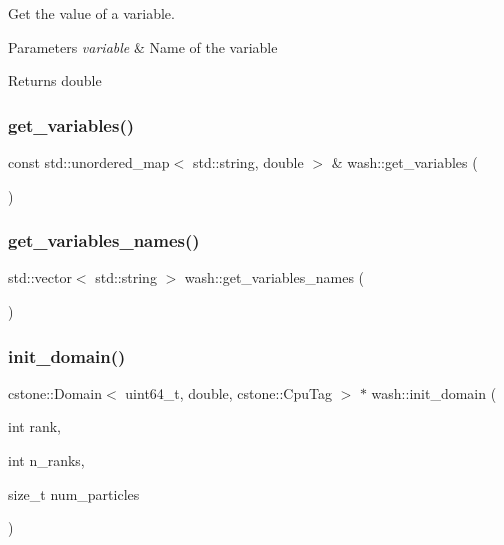 Get the value of a variable. 


\begin{DoxyParams}{Parameters}
{\em variable} & Name of the variable \\
\hline
\end{DoxyParams}
\begin{DoxyReturn}{Returns}
double 
\end{DoxyReturn}
\mbox{\label{namespacewash_a1c3211b3b0c5f804ecd247b159703b68}} 
\subsubsection{\texorpdfstring{get\+\_\+variables()}{get\_variables()}}
{\footnotesize\ttfamily const std\+::unordered\+\_\+map$<$ std\+::string, double $>$ \& wash\+::get\+\_\+variables (\begin{DoxyParamCaption}{ }\end{DoxyParamCaption})}

\mbox{\label{namespacewash_aebd88baa23220ce7842c503157c0bb71}} 
\subsubsection{\texorpdfstring{get\+\_\+variables\+\_\+names()}{get\_variables\_names()}}
{\footnotesize\ttfamily std\+::vector$<$ std\+::string $>$ wash\+::get\+\_\+variables\+\_\+names (\begin{DoxyParamCaption}{ }\end{DoxyParamCaption})}

\mbox{\label{namespacewash_a1473dce3a353e16eae7e13990f27a9b3}} 
\subsubsection{\texorpdfstring{init\+\_\+domain()}{init\_domain()}}
{\footnotesize\ttfamily cstone\+::\+Domain$<$ uint64\+\_\+t, double, cstone\+::\+Cpu\+Tag $>$ $\ast$ wash\+::init\+\_\+domain (\begin{DoxyParamCaption}\item[{int}]{rank,  }\item[{int}]{n\+\_\+ranks,  }\item[{size\+\_\+t}]{num\+\_\+particles }\end{DoxyParamCaption})}

